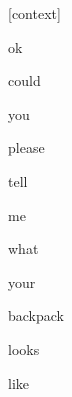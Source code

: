 \documentclass[varwidth]{standalone}
\begin{document}
\begin{CJK*}{UTF8}{gbsn}
{\setlength{\fboxsep}{0pt}\colorbox{white!0}{\parbox{0.9\textwidth}{
\colorbox{red!6.167226771926063e-16}{\strut [context]} \colorbox{red!4.663072559196735e-07}{\strut ok} \colorbox{red!1.811494740877606e-07}{\strut could} \colorbox{red!4.0624135522193683e-07}{\strut you} \colorbox{red!0.0013642047997564077}{\strut please} \colorbox{red!0.0016331006772816181}{\strut tell} \colorbox{red!0.055986903607845306}{\strut me} \colorbox{red!0.00920771062374115}{\strut what} \colorbox{red!0.13350339233875275}{\strut your} \colorbox{red!0.08255822211503983}{\strut backpack} \colorbox{red!47.50494384765625}{\strut looks} \colorbox{red!52.21080780029297}{\strut like} 
}}}
\end{CJK*}
\end{document}

